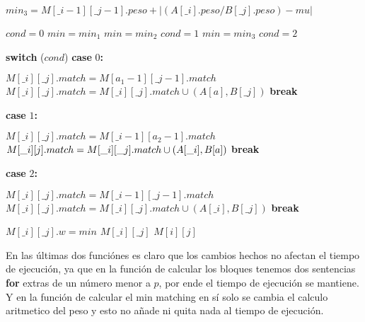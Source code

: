 \documentclass[12pt]{article}
\makeatletter
\newcommand{\SWITCH}[1]{\STATE \textbf{switch} (#1)}
\newcommand{\CASE}[1]{\STATE \textbf{case} #1\textbf{:} \begin{ALC@g}}
\newcommand{\ENDCASE}{\end{ALC@g}}
\makeatother
\begin{document}
\begin{algorithmic}[1]
            \STATE $min_3 = M[\_i - 1][\_j - 1].peso + |(A[\_i].peso / B[\_j].peso) - mu|$
            
            \STATE $cond = 0$
            \STATE $min = min_1$
                \STATE $min = min_2$
                \STATE $cond = 1$
                \STATE $min = min_3$
                \STATE $cond = 2$
            \ENDIF
            
            \SWITCH{$cond$}
            \CASE{$0$}                                                     
                \STATE $M[\_i][\_j].match = M[a_1-1][\_j-1].match$
                    \STATE $M[\_i][\_j].match = M[\_i][\_j].match \cup (A[a],B[\_j])$
                \ENDFOR
                \STATE \textbf{break}
            \ENDCASE
            \CASE{$1$}                                                     
                \STATE $M[\_i][\_j].match = M[\_i-1][a_2-1].match$
                    \STATE $M[\_i][\-j].match = M[\_i][\_j].match \cup (A[\_i],B[a])$
                \ENDFOR
                \STATE \textbf{break}
            \ENDCASE
            \CASE{$2$}                                                     
                \STATE $M[\_i][\_j].match = M[\_i-1][\_j-1].match$
                \STATE $M[\_i][\_j].match = M[\_i][\_j].match \cup (A[\_i],B[\_j])$
                \STATE \textbf{break}
            \ENDCASE
            \STATE $M[\_i][\_j].w = min$
            \RETURN $M[\_i][\_j]$
        \ENDFOR
    \ENDFOR
    \RETURN $M[i][j]$
\end{algorithmic}

En las últimas dos funciónes es claro que los cambios hechos no afectan el tiempo de ejecución, ya que en la función de calcular los bloques tenemos dos sentencias \textbf{for} extras de un número menor a $p$, por ende el tiempo de ejecución se mantiene. Y en la función de calcular el min matching en sí solo se cambia el calculo aritmetico del peso y esto no añade ni quita nada al tiempo de ejecución.
\end{document}
